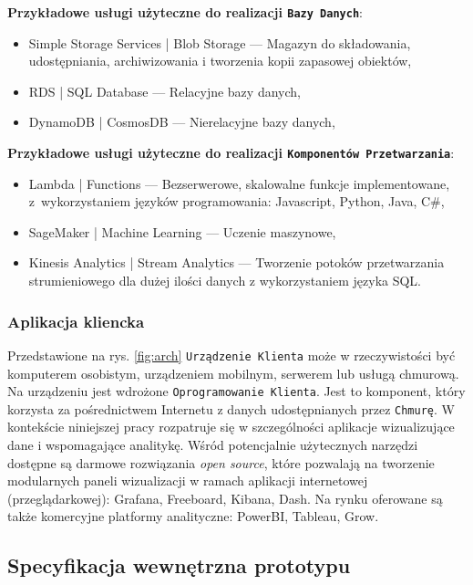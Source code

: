 \documentclass[a4paper, 12pt, twoside]{article}
\begin{document}
\noindent\textbf{Przykładowe usługi użyteczne do realizacji \texttt{Bazy Danych}}:
\begin{itemize}
      \itemsep0em
      \item Simple Storage Services | Blob Storage --- Magazyn do składowania,
            udostępniania, archiwizowania i tworzenia kopii zapasowej obiektów,
      \item RDS | SQL Database --- Relacyjne bazy danych,
      \item DynamoDB | CosmosDB --- Nierelacyjne bazy danych,
\end{itemize}

\noindent\textbf{Przykładowe usługi użyteczne do realizacji \texttt{Komponentów Przetwarzania}}:
\begin{itemize}
      \itemsep0em
      \item Lambda | Functions --- Bezserwerowe, skalowalne funkcje implementowane,
            z~wykorzystaniem języków programowania: Javascript, Python, Java, C\#,
      \item SageMaker | Machine Learning --- Uczenie maszynowe,
      \item Kinesis Analytics | Stream Analytics --- Tworzenie potoków przetwarzania
            strumieniowego dla dużej ilości danych z wykorzystaniem języka SQL.
\end{itemize}

\subsubsection{Aplikacja kliencka}

Przedstawione na rys. \ref{fig:arch} \texttt{Urządzenie Klienta} może w rzeczywistości
być komputerem osobistym, urządzeniem mobilnym, serwerem lub usługą chmurową.
Na urządzeniu jest wdrożone \texttt{Oprogramowanie Klienta}. Jest to komponent, który
korzysta za pośrednictwem Internetu z danych udostępnianych przez \texttt{Chmurę}.
W kontekście niniejszej pracy rozpatruje się w szczególności
aplikacje wizualizujące dane i wspomagające analitykę. Wśród potencjalnie
użytecznych narzędzi dostępne są darmowe rozwiązania \emph{open source}, które
pozwalają na tworzenie modularnych paneli wizualizacji w ramach
aplikacji internetowej (przeglądarkowej): Grafana,
Freeboard, Kibana, Dash. Na rynku oferowane są także komercyjne platformy analityczne:
PowerBI, Tableau, Grow.

\subsection{Specyfikacja wewnętrzna prototypu}
\end{document}
